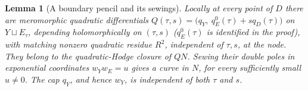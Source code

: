 \documentclass[12pt]{article}
\newtheorem{lemma}[theorem]{Lemma}
\theoremstyle{remark}
\begin{document}
\begin{lemma}[A boundary pencil and its sewings]\label{lem:cap-pencil}
Locally at every point of \(D\) there are meromorphic quadratic
differentials
\(Q(\tau,s)=\bigl(q_Y,\ q_E^0(\tau)+s q_D(\tau)\bigr)\)
on \(Y\sqcup E_\tau\), depending holomorphically on \((\tau,s)\)
(\(q_E^0(\tau)\) is identified in the proof),
with matching nonzero quadratic residue
\(R^2\), independent of \(\tau,s\), at the node.
They belong to the quadratic-Hodge closure of \(QN\).
Sewing their double poles in exponential coordinates
\(w_Yw_E=u\) gives a curve in \(N\), for every sufficiently
small \(u\ne0\). The cap \(q_Y\), and hence \(w_Y\), is
independent of both \(\tau\) and \(s\).
\end{lemma}
\end{document}
